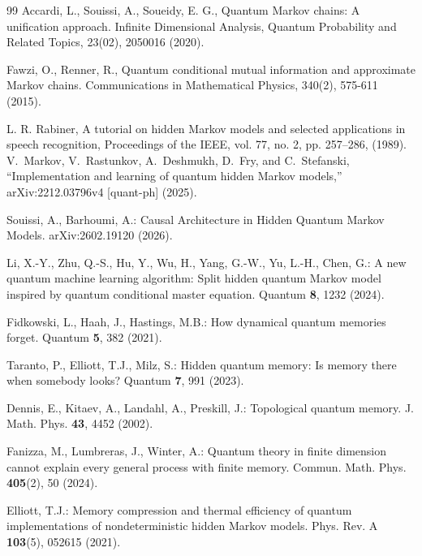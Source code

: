 \documentclass[11pt,a4paper]{article}
\begin{document}
\begin{thebibliography}{99}
 Accardi, L., Souissi, A.,   Soueidy, E. G.,  Quantum Markov chains: A unification approach. Infinite Dimensional Analysis, Quantum Probability and Related Topics, 23(02), 2050016 (2020).

 Fawzi, O.,   Renner, R., Quantum conditional mutual information and approximate Markov chains. Communications in Mathematical Physics, 340(2), 575-611  (2015).


L. R. Rabiner, A tutorial on hidden Markov models and selected applications in speech recognition, Proceedings of the IEEE, vol. 77, no. 2, pp. 257–286, (1989).
V.~Markov, V.~Rastunkov, A.~Deshmukh, D.~Fry, and C.~Stefanski,
``Implementation and learning of quantum hidden Markov models,''
arXiv:2212.03796v4 [quant-ph] (2025).


Souissi, A., Barhoumi, A.:
Causal Architecture in Hidden Quantum Markov Models.
arXiv:2602.19120 (2026).

Li, X.-Y., Zhu, Q.-S., Hu, Y., Wu, H., Yang, G.-W., Yu, L.-H., Chen, G.:
A new quantum machine learning algorithm: Split hidden quantum Markov model inspired by quantum conditional master equation.
Quantum \textbf{8}, 1232 (2024).



Fidkowski, L., Haah, J., Hastings, M.B.:
How dynamical quantum memories forget.
Quantum \textbf{5}, 382 (2021).

Taranto, P., Elliott, T.J., Milz, S.:
Hidden quantum memory: Is memory there when somebody looks?
Quantum \textbf{7}, 991 (2023).

Dennis, E., Kitaev, A., Landahl, A., Preskill, J.: Topological quantum memory.
J. Math. Phys. \textbf{43}, 4452 (2002).

Fanizza, M., Lumbreras, J., Winter, A.:
Quantum theory in finite dimension cannot explain every general process with finite memory.
Commun. Math. Phys. \textbf{405}(2), 50 (2024).

Elliott, T.J.:
Memory compression and thermal efficiency of quantum implementations of nondeterministic hidden Markov models.
Phys. Rev. A \textbf{103}(5), 052615 (2021).




\end{thebibliography}
\end{document}

